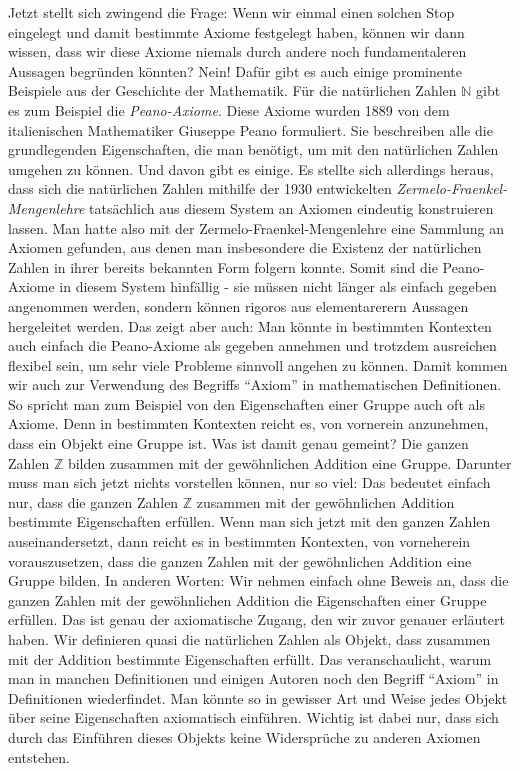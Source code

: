 Jetzt stellt sich zwingend die Frage: Wenn wir einmal einen solchen Stop eingelegt und damit bestimmte Axiome festgelegt haben, können wir dann wissen, dass wir diese Axiome niemals durch andere noch fundamentaleren Aussagen begründen könnten? Nein! Dafür gibt es auch einige prominente Beispiele aus der Geschichte der Mathematik. Für die natürlichen Zahlen \(\mathbb N\) gibt es zum Beispiel die \textit{Peano-Axiome}. Diese Axiome wurden 1889 von dem italienischen Mathematiker Giuseppe Peano formuliert. Sie beschreiben alle die grundlegenden Eigenschaften, die man benötigt, um mit den natürlichen Zahlen umgehen zu können. Und davon gibt es einige. Es stellte sich allerdings heraus, dass sich die natürlichen Zahlen mithilfe der 1930 entwickelten \textit{Zermelo-Fraenkel-Mengenlehre} tatsächlich aus diesem System an Axiomen eindeutig konstruieren lassen. Man hatte also mit der Zermelo-Fraenkel-Mengenlehre eine Sammlung an Axiomen gefunden, aus denen man insbesondere die Existenz der natürlichen Zahlen in ihrer bereits bekannten Form folgern konnte. Somit sind die Peano-Axiome in diesem System hinfällig - sie müssen nicht länger als einfach gegeben angenommen werden, sondern können rigoros aus elementarerern Aussagen hergeleitet werden. Das zeigt aber auch: Man könnte in bestimmten Kontexten auch einfach die Peano-Axiome als gegeben annehmen und trotzdem ausreichen flexibel sein, um sehr viele Probleme sinnvoll angehen zu können. Damit kommen wir auch zur Verwendung des Begriffs "`Axiom"' in mathematischen Definitionen. So spricht man zum Beispiel von den Eigenschaften einer Gruppe auch oft als Axiome. Denn in bestimmten Kontexten reicht es, von vornerein anzunehmen, dass ein Objekt eine Gruppe ist. Was ist damit genau gemeint? Die ganzen Zahlen \(\mathbb Z\) bilden zusammen mit der gewöhnlichen Addition eine Gruppe. Darunter muss man sich jetzt nichts vorstellen können, nur so viel: Das bedeutet einfach nur, dass die ganzen Zahlen \(\mathbb Z\) zusammen mit der gewöhnlichen Addition bestimmte Eigenschaften erfüllen. Wenn man sich jetzt mit den ganzen Zahlen auseinandersetzt, dann reicht es in bestimmten Kontexten, von vorneherein vorauszusetzen, dass die ganzen Zahlen mit der gewöhnlichen Addition eine Gruppe bilden. In anderen Worten: Wir nehmen einfach ohne Beweis an, dass die ganzen Zahlen mit der gewöhnlichen Addition die Eigenschaften einer Gruppe erfüllen. Das ist genau der axiomatische Zugang, den wir zuvor genauer erläutert haben. Wir definieren quasi die natürlichen Zahlen als Objekt, dass zusammen mit der Addition bestimmte Eigenschaften erfüllt. Das veranschaulicht, warum man in manchen Definitionen und einigen Autoren noch den Begriff "`Axiom"' in Definitionen wiederfindet. Man könnte so in gewisser Art und Weise jedes Objekt über seine Eigenschaften axiomatisch einführen. Wichtig ist dabei nur, dass sich durch das Einführen dieses Objekts keine Widersprüche zu anderen Axiomen entstehen. 

